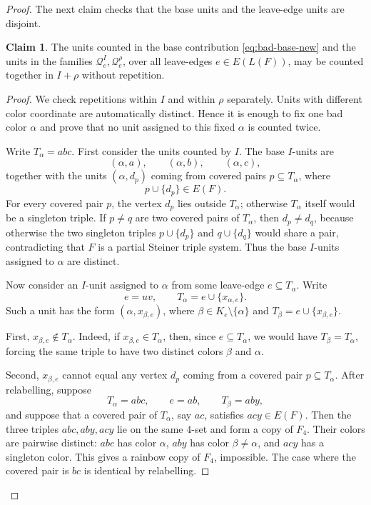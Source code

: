 \documentclass[10pt,a4paper]{article}
\theoremstyle{definition}
\newtheorem{claim}[theorem]{Claim}
\begin{document}
\begin{proof}
    The next claim checks that the base units and the leave-edge units are disjoint.

    \begin{claim}\label{clm:bad-disjoint-new}
        The units counted in the base contribution
        \eqref{eq:bad-base-new} and the units in the families
        $\mathcal Q_e^I,\mathcal Q_e^\rho$, over all leave-edges
        $e\in E(L(F))$, may be counted together in $I+\rho$ without
        repetition.
    \end{claim}

    \begin{proof}
        We check repetitions within $I$ and within $\rho$ separately.  Units
        with different color coordinate are automatically distinct.  Hence it
        is enough to fix one bad color $\alpha$ and prove that no unit
        assigned to this fixed $\alpha$ is counted twice.

        Write $T_\alpha=abc$.
        First consider the units counted by $I$.  The base $I$-units are
        \[
            (\alpha,a),\qquad (\alpha,b),\qquad (\alpha,c),
        \]
        together with the units $(\alpha,d_p)$ coming from covered pairs
        $p\subseteq T_\alpha$, where
        \[
            p\cup\{d_p\}\in E(F).
        \]
        For every covered pair $p$, the vertex $d_p$ lies outside
        $T_\alpha$; otherwise $T_\alpha$ itself would be a singleton triple.
        If $p\ne q$ are two covered pairs of $T_\alpha$, then
        $d_p\ne d_q$, because otherwise the two singleton triples $p\cup\{d_p\}$ and $q\cup\{d_q\}$ would share a pair, contradicting that $F$ is a partial Steiner triple
        system.  Thus the base $I$-units assigned to $\alpha$ are distinct.

        Now consider an $I$-unit assigned to $\alpha$ from some leave-edge
        $e\subseteq T_\alpha$.  Write
        \[
            e=uv,
            \qquad
            T_\alpha=e\cup\{x_{\alpha,e}\}.
        \]
        Such a unit has the form $(\alpha,x_{\beta,e})$, where $\beta\in K_e\setminus\{\alpha\}$ and $T_\beta=e\cup\{x_{\beta,e}\}$.

        First, $x_{\beta,e}\notin T_\alpha$.  Indeed, if
        $x_{\beta,e}\in T_\alpha$, then, since $e\subseteq T_\alpha$, we
        would have $T_\beta=T_\alpha$,
        forcing the same triple to have two distinct colors $\beta$ and
        $\alpha$.

        Second, $x_{\beta,e}$ cannot equal any vertex $d_p$ coming from a
        covered pair $p\subseteq T_\alpha$.  After relabelling, suppose
        \[
            T_\alpha=abc,\qquad e=ab,\qquad T_\beta=aby,
        \]
        and suppose that a covered pair of $T_\alpha$, say $ac$, satisfies $acy\in E(F)$.
        Then the three triples $abc,aby,acy$ lie on the same $4$-set and form a copy of $F_4$.
        Their colors are pairwise distinct: $abc$ has color $\alpha$, $aby$ has color $\beta\ne\alpha$, and $acy$ has a singleton color.
        This gives a rainbow copy of $F_4$, impossible.
        The case where the covered pair is $bc$ is identical by relabelling.


\end{proof}
\end{proof}
\end{document}
